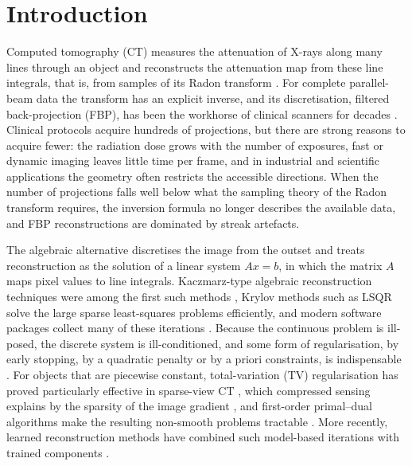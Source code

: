\documentclass[11pt,a4paper]{article}
\numberwithin{equation}{section}
\theoremstyle{remark}
\begin{document}
\section{Introduction}\label{sec:intro}

Computed tomography (CT) measures the attenuation of X-rays along many lines through an object and reconstructs the attenuation map from these line integrals, that is, from samples of its Radon transform \citep{radon1917,natterer2001}. For complete parallel-beam data the transform has an explicit inverse, and its discretisation, filtered back-projection (FBP), has been the workhorse of clinical scanners for decades \citep{kak2001,herman2009}. Clinical protocols acquire hundreds of projections, but there are strong reasons to acquire fewer: the radiation dose grows with the number of exposures, fast or dynamic imaging leaves little time per frame, and in industrial and scientific applications the geometry often restricts the accessible directions. When the number of projections falls well below what the sampling theory of the Radon transform requires, the inversion formula no longer describes the available data, and FBP reconstructions are dominated by streak artefacts.

The algebraic alternative discretises the image from the outset and treats reconstruction as the solution of a linear system $Ax=b$, in which the matrix $A$ maps pixel values to line integrals. Kaczmarz-type algebraic reconstruction techniques were among the first such methods \citep{gordon1970,andersen1984}, Krylov methods such as LSQR \citep{paige1982} solve the large sparse least-squares problems efficiently, and modern software packages collect many of these iterations \citep{hansen2018}. Because the continuous problem is ill-posed, the discrete system is ill-conditioned, and some form of regularisation, by early stopping, by a quadratic penalty or by a priori constraints, is indispensable \citep{engl1996,hansen2010,kaipio2005}. For objects that are piecewise constant, total-variation (TV) regularisation \citep{rudin1992} has proved particularly effective in sparse-view CT \citep{sidky2008}, which compressed sensing explains by the sparsity of the image gradient \citep{candes2006,jorgensen2015}, and first-order primal--dual algorithms make the resulting non-smooth problems tractable \citep{chambolle2011,sidky2012,chambolle2016}. More recently, learned reconstruction methods have combined such model-based iterations with trained components \citep{jin2017,adler2018}.
\end{document}
